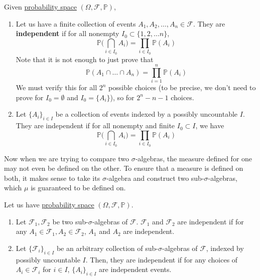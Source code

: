   \begin{definition}
    \label{def:independence-of-n-events}
    Given \hyperref[def:probability-space]{probability space} $(\Omega, \mathcal{F}, \mathbb{P})$, 
    \begin{enumerate}
      \item Let us have a finite collection of events $A_1, A_2, \ldots, A_n \in \mathcal{F}$. They are \textbf{independent} if for all nonempty $I_0 \subset \{1, 2, \ldots n\}$, 
      \begin{equation}
        \mathbb{P} \bigg( \bigcap_{i \in I_0} A_i \bigg) = \prod_{i \in I_0} \mathbb{P}(A_i)
      \end{equation}
      Note that it is not enough to just prove that 
      \begin{equation}
        \mathbb{P}(A_1 \cap \ldots \cap A_n) = \prod_{i=1}^n \mathbb{P}(A_i)
      \end{equation}
      We must verify this for all $2^n$ possible choices (to be precise, we don't need to prove for $I_0 = \emptyset$ and $I_0 = \{A_i\}$), so for $2^n - n - 1$ choices. 
      
      \item Let $\{A_i\}_{i \in I}$ be a collection of events indexed by a possibly uncountable $I$. They are independent if for all nonempty and finite $I_0 \subset I$, we have 
      \begin{equation}
        \mathbb{P} \bigg( \bigcap_{i \in I_0} A_i \bigg) = \prod_{i \in I_0} \mathbb{P}(A_i)
      \end{equation}
    \end{enumerate}
  \end{definition}

  Now when we are trying to compare two $\sigma$-algebras, the measure defined for one may not even be defined on the other. To ensure that a measure is defined on both, it makes sense to take its $\sigma$-algebra and construct two sub-$\sigma$-algebras, which $\mu$ is guaranteed to be defined on. 

  \begin{definition}
    \label{def:independence-of-sigma-algebras}
    Let us have \hyperref[def:probability-space]{probability space} $(\Omega, \mathcal{F}, \mathbb{P})$. 
    \begin{enumerate}
      \item Let $\mathcal{F}_1, \mathcal{F}_2$ be two sub-$\sigma$-algebras of $\mathcal{F}$. $\mathcal{F}_1$ and $\mathcal{F}_2$ are independent if for any $A_1 \in \mathcal{F}_1, A_2 \in \mathcal{F}_2$, $A_1$ and $A_2$ are independent. 
      \item Let $\{ \mathcal{F}_i\}_{i \in I}$ be an arbitrary collection of sub-$\sigma$-algebras of $\mathcal{F}$, indexed by possibly uncountable $I$. Then, they are independent if for any choices of $A_i \in \mathcal{F}_i$ for $i \in I$, $\{A_i\}_{i \in I}$ are independent events. 
    \end{enumerate}
  \end{definition}

